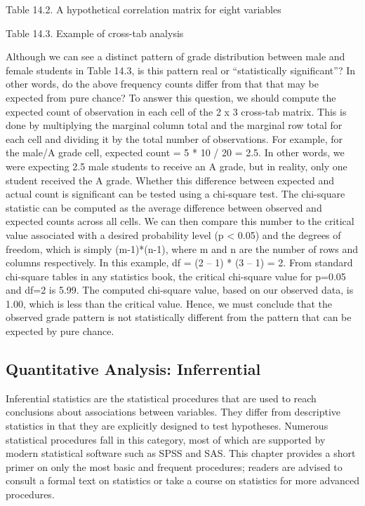 Table 14.2. A hypothetical correlation matrix for eight variables

Table 14.3. Example of cross-tab analysis

Although we can see a distinct pattern of grade distribution between male and female students in Table 14.3, is this pattern real or “statistically significant”? In other words, do the above frequency counts differ from that that may be expected from pure chance? To answer this question, we should compute the expected count of observation in each cell of the 2 x 3 cross-tab matrix. This is done by multiplying the marginal column total and the marginal row total for each cell and dividing it by the total number of observations. For example, for the male/A grade cell, expected count = 5 * 10 / 20 = 2.5. In other words, we were expecting 2.5 male students to receive an A grade, but in reality, only one student received the A grade. Whether this difference between expected and actual count is significant can be tested using a chi-square test. The chi-square statistic can be computed as the average difference between observed and expected counts across all cells. We can then compare this number to the critical value associated with a desired probability level (p < 0.05) and the degrees of freedom, which is simply (m-1)*(n-1), where m and n are the number of rows and columns respectively. In this example, df = (2 – 1) * (3 – 1) = 2. From standard chi-square tables in any statistics book, the critical chi-square value for p=0.05 and df=2 is 5.99. The computed chi-square value, based on our observed data, is 1.00, which is less than the critical value. Hence, we must conclude that the observed grade pattern is not statistically different from the pattern that can be expected by pure chance.

\subsection{Quantitative Analysis: Inferrential}

Inferential statistics are the statistical procedures that are used to reach conclusions about associations between variables. They differ from descriptive statistics in that they are explicitly designed to test hypotheses. Numerous statistical procedures fall in this category, most of which are supported by modern statistical software such as SPSS and SAS. This chapter provides a short primer on only the most basic and frequent procedures; readers are advised to consult a formal text on statistics or take a course on statistics for more advanced procedures.

